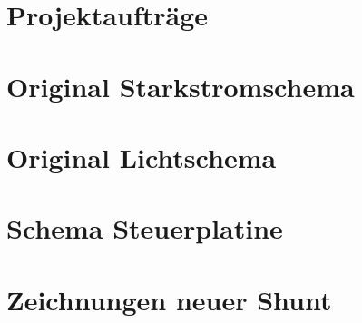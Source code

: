 \chapter{Projektaufträge}

%

%

\chapter{Original Starkstromschema}\label{schema_original}


\chapter{Original Lichtschema}\label{app:licht}


\chapter{Schema Steuerplatine}\label{Anh_Steuerplatine}



\chapter{Zeichnungen neuer Shunt}\label{app:2d}




